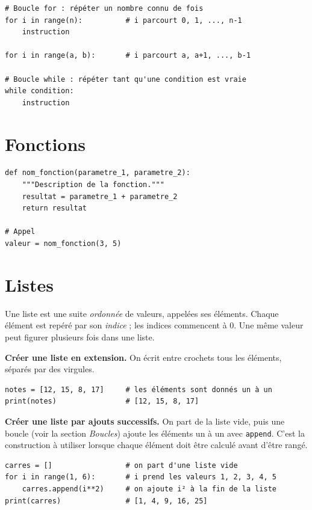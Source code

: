 \begin{verbatim}
# Boucle for : répéter un nombre connu de fois
for i in range(n):          # i parcourt 0, 1, ..., n-1
    instruction

for i in range(a, b):       # i parcourt a, a+1, ..., b-1

# Boucle while : répéter tant qu'une condition est vraie
while condition:
    instruction
\end{verbatim}

\section*{Fonctions}

\begin{verbatim}
def nom_fonction(parametre_1, parametre_2):
    """Description de la fonction."""
    resultat = parametre_1 + parametre_2
    return resultat

# Appel
valeur = nom_fonction(3, 5)
\end{verbatim}

\section*{Listes}

Une liste est une suite \emph{ordonnée} de valeurs, appelées ses éléments.
Chaque élément est repéré par son \emph{indice} ; les indices commencent à 0.
Une même valeur peut figurer plusieurs fois dans une liste.

\textbf{Créer une liste en extension.}
On écrit entre crochets tous les éléments, séparés par des virgules.

\begin{verbatim}
notes = [12, 15, 8, 17]     # les éléments sont donnés un à un
print(notes)                # [12, 15, 8, 17]
\end{verbatim}

\textbf{Créer une liste par ajouts successifs.}
On part de la liste vide, puis une boucle (voir la section \emph{Boucles})
ajoute les éléments un à un avec \verb|append|. C'est la construction à
utiliser lorsque chaque élément doit être calculé avant d'être rangé.

\begin{verbatim}
carres = []                 # on part d'une liste vide
for i in range(1, 6):       # i prend les valeurs 1, 2, 3, 4, 5
    carres.append(i**2)     # on ajoute i² à la fin de la liste
print(carres)               # [1, 4, 9, 16, 25]
\end{verbatim}

